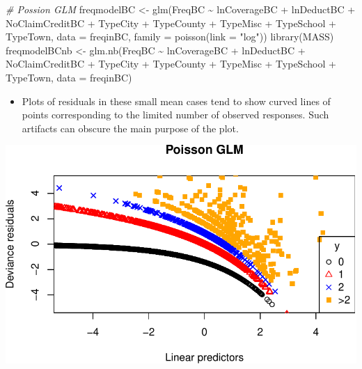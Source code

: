 \documentclass[
  ignorenonframetext,
]{beamer}
\newenvironment{Shaded}{\begin{snugshade}}{\end{snugshade}}
\newcommand{\AttributeTok}[1]{\textcolor[rgb]{0.77,0.63,0.00}{#1}}
\newcommand{\CommentTok}[1]{\textcolor[rgb]{0.56,0.35,0.01}{\textit{#1}}}
\newcommand{\FunctionTok}[1]{\textcolor[rgb]{0.00,0.00,0.00}{#1}}
\newcommand{\NormalTok}[1]{#1}
\newcommand{\OtherTok}[1]{\textcolor[rgb]{0.56,0.35,0.01}{#1}}
\newcommand{\SpecialCharTok}[1]{\textcolor[rgb]{0.00,0.00,0.00}{#1}}
\newcommand{\StringTok}[1]{\textcolor[rgb]{0.31,0.60,0.02}{#1}}
\providecommand{\tightlist}{%
  \setlength{\itemsep}{0pt}\setlength{\parskip}{0pt}}
\begin{document}
\begin{frame}[fragile]{}
\protect\hypertarget{section-3}{}
\scriptsize

\begin{Shaded}
\begin{Highlighting}[]
\CommentTok{\# Possion GLM}
\NormalTok{freqmodelBC }\OtherTok{\textless{}{-}} \FunctionTok{glm}\NormalTok{(FreqBC }\SpecialCharTok{\textasciitilde{}}\NormalTok{ lnCoverageBC }\SpecialCharTok{+}\NormalTok{ lnDeductBC }\SpecialCharTok{+}\NormalTok{ NoClaimCreditBC }\SpecialCharTok{+}
\NormalTok{                     TypeCity }\SpecialCharTok{+}\NormalTok{ TypeCounty }\SpecialCharTok{+}\NormalTok{ TypeMisc }\SpecialCharTok{+}\NormalTok{ TypeSchool }\SpecialCharTok{+}\NormalTok{ TypeTown,}
                   \AttributeTok{data =}\NormalTok{ freqinBC, }\AttributeTok{family =} \FunctionTok{poisson}\NormalTok{(}\AttributeTok{link =} \StringTok{"log"}\NormalTok{))}
\FunctionTok{library}\NormalTok{(MASS)}
\NormalTok{freqmodelBCnb }\OtherTok{\textless{}{-}} \FunctionTok{glm.nb}\NormalTok{(FreqBC }\SpecialCharTok{\textasciitilde{}}\NormalTok{ lnCoverageBC }\SpecialCharTok{+}\NormalTok{ lnDeductBC }\SpecialCharTok{+}\NormalTok{ NoClaimCreditBC }\SpecialCharTok{+}
\NormalTok{                     TypeCity }\SpecialCharTok{+}\NormalTok{ TypeCounty }\SpecialCharTok{+}\NormalTok{ TypeMisc }\SpecialCharTok{+}\NormalTok{ TypeSchool }\SpecialCharTok{+}\NormalTok{ TypeTown,}
                   \AttributeTok{data =}\NormalTok{ freqinBC)}
\end{Highlighting}
\end{Shaded}
\end{frame}

\begin{frame}{}
\protect\hypertarget{section-4}{}
\begin{itemize}
\tightlist
\item
  Plots of residuals in these small mean cases tend to show curved lines
  of points corresponding to the limited number of observed responses.
  Such artifacts can obscure the main purpose of the plot.
\end{itemize}

\includegraphics{week8_p1_files/figure-beamer/unnamed-chunk-8-1.pdf}
\end{frame}
\end{document}
